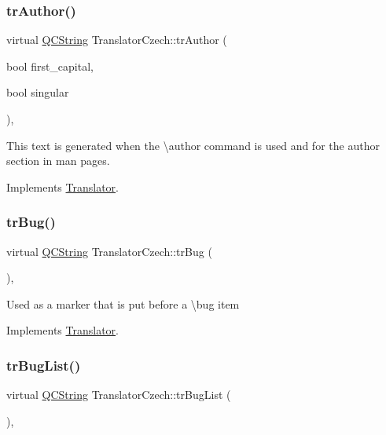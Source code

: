 \subsubsection{\texorpdfstring{trAuthor()}{trAuthor()}}
{\footnotesize\ttfamily virtual \mbox{\hyperlink{class_q_c_string}{Q\+C\+String}} Translator\+Czech\+::tr\+Author (\begin{DoxyParamCaption}\item[{bool}]{first\+\_\+capital,  }\item[{bool}]{singular }\end{DoxyParamCaption})\hspace{0.3cm}{\ttfamily [inline]}, {\ttfamily [virtual]}}

This text is generated when the \textbackslash{}author command is used and for the author section in man pages. 

Implements \mbox{\hyperlink{class_translator}{Translator}}.

\mbox{\label{class_translator_czech_afee8af424e80ab3c46243633176afc54}} 
\subsubsection{\texorpdfstring{trBug()}{trBug()}}
{\footnotesize\ttfamily virtual \mbox{\hyperlink{class_q_c_string}{Q\+C\+String}} Translator\+Czech\+::tr\+Bug (\begin{DoxyParamCaption}{ }\end{DoxyParamCaption})\hspace{0.3cm}{\ttfamily [inline]}, {\ttfamily [virtual]}}

Used as a marker that is put before a \textbackslash{}bug item 

Implements \mbox{\hyperlink{class_translator}{Translator}}.

\mbox{\label{class_translator_czech_aaf47832229e4dc495eb861a32d13ca30}} 
\subsubsection{\texorpdfstring{trBugList()}{trBugList()}}
{\footnotesize\ttfamily virtual \mbox{\hyperlink{class_q_c_string}{Q\+C\+String}} Translator\+Czech\+::tr\+Bug\+List (\begin{DoxyParamCaption}{ }\end{DoxyParamCaption})\hspace{0.3cm}{\ttfamily [inline]}, {\ttfamily [virtual]}}

